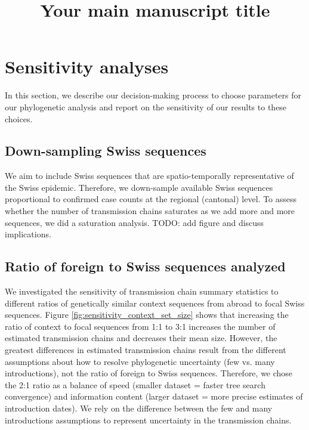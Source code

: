 \documentclass[9pt,twoside,lineno]{pnas-new}
\title{Your main manuscript title}
\begin{document}


\section{Sensitivity analyses}

In this section, we describe our decision-making process to choose parameters for our phylogenetic analysis and report on the sensitivity of our results to these choices. 

\subsection{Down-sampling Swiss sequences}
We aim to include Swiss sequences that are spatio-temporally representative of the Swiss epidemic. Therefore, we down-sample available Swiss sequences proportional to confirmed case counts at the regional (cantonal) level. To assess whether the number of transmission chains saturates as we add more and more sequences, we did a saturation analysis. TODO: add figure and discuss implications.

\subsection{Ratio of foreign to Swiss sequences analyzed}
We investigated the sensitivity of transmission chain summary statistics to different ratios of genetically similar context sequences from abroad to focal Swiss sequences. Figure \ref{fig:sensitivity_context_set_size} shows that increasing the ratio of context to focal sequences from 1:1 to 3:1 increases the number of estimated transmission chains and decreases their mean size. However, the greatest differences in estimated transmission chains result from the different assumptions about how to resolve phylogenetic uncertainty (few vs. many introductions), not the ratio of foreign to Swiss sequences. Therefore, we chose the 2:1 ratio as a balance of speed (smaller dataset = faster tree search convergence) and information content (larger dataset = more precise estimates of introduction dates). We rely on the difference between the few and many introductions assumptions to represent uncertainty in the transmission chains.
\end{document}
